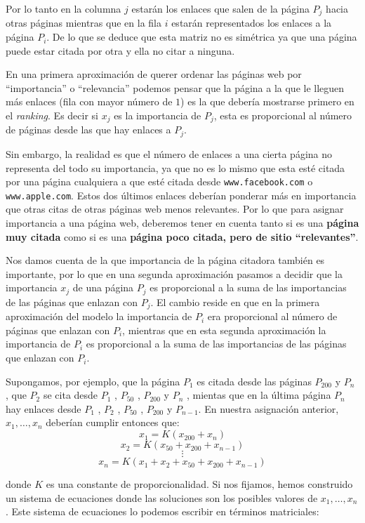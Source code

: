 \documentclass[size=a4, parskip=half, titlepage=false, toc=flat, toc=bib, 12pt]{scrartcl}
\theoremstyle{theorem-style}
\theoremstyle{definition-style}
\theoremstyle{remark-style}
\theoremstyle{example-style}
\theoremstyle{definition-style}
\theoremstyle{remark-style}
\begin{document}
Por lo tanto en la columna $j$ estarán los enlaces que salen de la página $P_j$ hacia otras páginas
mientras que en la fila $i$ estarán representados los enlaces a la página $P_i$. De lo que se deduce que esta matriz
no es simétrica ya que una página puede estar citada por otra y ella no citar a ninguna.

En una primera aproximación de querer ordenar las páginas web por ``importancia'' o ``relevancia'' podemos
pensar que la página a la que le lleguen más enlaces (fila con mayor número de $1$) es la que debería
mostrarse primero en el \textit{ranking}. Es decir si $x_j$ es la importancia de $P_j$, esta es proporcional
al número de páginas desde las que hay enlaces a $P_j$.

Sin embargo, la realidad es que el número de enlaces a una cierta página no representa del todo su importancia,
ya que no es lo mismo que esta esté citada por una página cualquiera a que esté citada desde \verb|www.facebook.com| o
\verb|www.apple.com|. Estos dos últimos enlaces deberían ponderar más en importancia que otras citas de
otras páginas web menos relevantes. Por lo que para asignar importancia a una página web, deberemos tener
en cuenta tanto si es una \textbf{página muy citada} como si es una \textbf{página poco citada, pero de sitio ``relevantes''}.

Nos damos cuenta de la que importancia de la página citadora también es importante, por lo que en una segunda aproximación pasamos a decidir que la importancia $x_j$ de una página $P_j$ es proporcional a la suma de las importancias de las páginas que enlazan con $P_j$. El cambio reside en que en la primera aproximación del modelo la importancia de $P_i$ era proporcional al número de páginas que enlazan con $P_i$, mientras que en esta segunda aproximación la importancia de $P_i$ es proporcional a la suma de las importancias de las páginas que enlazan con $P_i$.

Supongamos, por ejemplo, que la página $P_1$ es citada desde las páginas $P_{200}$ y $P_{n}$ ,
 que $P_2$ se cita desde $P_1$ , $P_{50}$ , $P_{200}$ y $P_n$ , mientas que en la última página $P_n$ hay enlaces desde $P_1$ , $P_2$ , $P_{50}$ , $P_{200}$ y $P_{n-1}$. En nuestra asignación anterior, $x_1, \dots , x_n$ deberían
 cumplir entonces que:
 $$ x_1 = K (x_{200} + x_n) $$
 $$ x_2 = K (x_{50} + x_{200} + x_{n-1}) $$
 $$ \vdots $$
 $$x_n = K (x_1 + x_2 + x_{50} + x_{200} + x_{n-1}) $$

donde $K$ es una constante de proporcionalidad. Si nos fijamos, hemos construido un sistema de ecuaciones
donde las soluciones son los posibles valores de $x_1, \dots , x_n$. Este sistema de ecuaciones
lo podemos escribir en términos matriciales:
\end{document}

